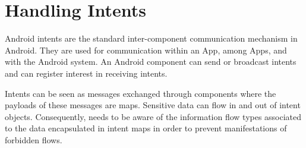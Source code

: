 \htmlhr

\newcommand{\app}{App\xspace}
\newcommand{\apps}{\app{}s\xspace}

\chapter{Handling Intents\label{flow-checker}}

Android intents are the standard inter-component communication
mechanism in Android.  They are used for communication within an \app,
among \apps, and with the Android system.  An Android component can
send or broadcast intents and can register interest in receiving
intents.

Intents can be seen as messages exchanged through components where the
payloads of these messages are maps.  Sensitive data can flow in and
out of intent objects.  Consequently, \theFlowChecker{} needs to be
aware of the information flow types associated to the data
encapsulated in intent maps in order to prevent manifestations of
forbidden flows.
